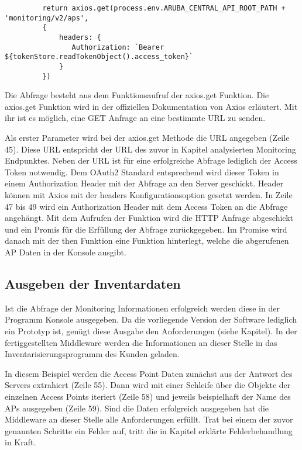 \lstset{firstnumber=13}
\begin{lstlisting}
         return axios.get(process.env.ARUBA_CENTRAL_API_ROOT_PATH + 'monitoring/v2/aps',
         {
             headers: {
          		Authorization: `Bearer ${tokenStore.readTokenObject().access_token}`
             }
         })    
\end{lstlisting}

Die Abfrage besteht aus dem Funktionsaufruf der axios.get Funktion. Die axios.get Funktion wird in der offiziellen Dokumentation von Axios erläutert. Mit ihr ist es möglich, eine GET Anfrage an eine bestimmte URL zu senden. 

Als erster Parameter wird bei der axios.get Methode die URL angegeben (Zeile 45). Diese URL entspricht der URL des zuvor in Kapitel analysierten Monitoring Endpunktes. Neben der URL ist für eine erfolgreiche Abfrage lediglich der Access Token notwendig. Dem OAuth2 Standard entsprechend wird dieser Token in einem Authorization Header mit der Abfrage an den Server geschickt. Header können mit Axios mit der headers Konfigurationsoption gesetzt werden. In Zeile 47 bis 49 wird ein Authorization Header mit dem Access Token an die Abfrage angehängt. Mit dem Aufrufen der Funktion wird die HTTP Anfrage abgeschickt und ein Promis für die Erfüllung der Abfrage zurückgegeben. Im Promise wird danach mit der then Funktion eine Funktion hinterlegt, welche die abgerufenen AP Daten in der Konsole ausgibt.

\subsection{Ausgeben der Inventardaten}

Ist die Abfrage der Monitoring Informationen erfolgreich werden diese in der Programm Konsole ausgegeben. Da die vorliegende Version der Software lediglich ein Prototyp ist, genügt diese Ausgabe den Anforderungen (siehe Kapitel). In der fertiggestellten Middleware werden die Informationen an dieser Stelle in das Inventarisierungsprogramm des Kunden geladen. 

In diesem Beispiel werden die Access Point Daten zunächst aus der Antwort des Servers extrahiert (Zeile 55). Dann wird mit einer Schleife über die Objekte der einzelnen Access Points iteriert (Zeile 58) und jeweils beispielhaft der Name des APs ausgegeben (Zeile 59).
Sind die Daten erfolgreich ausgegeben hat die Middleware an dieser Stelle alle Anforderungen erfüllt. Trat bei einem der zuvor genannten Schritte ein Fehler auf, tritt die in Kapitel erklärte Fehlerbehandlung in Kraft.



